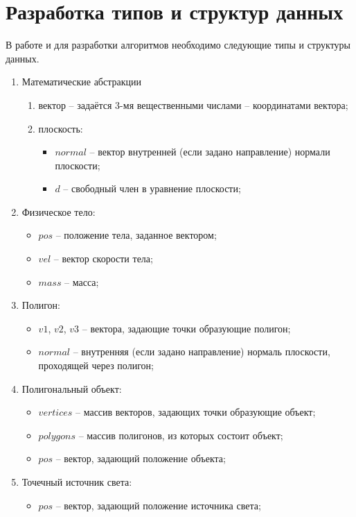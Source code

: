 \section{Разработка типов и структур данных}

В работе и для разработки алгоритмов необходимо следующие типы и структуры данных.

\begin{enumerate}
	\item Математические абстракции
	\begin{enumerate}
		\item вектор -- задаётся 3-мя вещественными числами -- координатами вектора;
		\item плоскость:
		\begin{itemize}
			\item $normal$ -- вектор внутренней (если задано направление) нормали плоскости;
			\item $d$ -- свободный член в уравнение плоскости;
		\end{itemize}
	\end{enumerate}
	\item Физическое тело:
	\begin{itemize}
		\item $pos$ -- положение тела, заданное вектором;
		\item $vel$ -- вектор скорости тела;
		\item $mass$ -- масса;
	\end{itemize}
	\item Полигон:
	\begin{itemize}
		\item $v1$, $v2$, $v3$ -- вектора, задающие точки образующие полигон;
		\item $normal$ -- внутренняя (если задано направление) нормаль плоскости, проходящей через полигон;
	\end{itemize}
	\item Полигональный объект:
	\begin{itemize}
		\item $vertices$ -- массив векторов, задающих точки образующие объект;
		\item $polygons$ -- массив полигонов, из которых состоит объект;
		\item $pos$ -- вектор, задающий положение объекта;
	\end{itemize}
	\item Точечный источник света:
	\begin{itemize}
		\item $pos$ -- вектор, задающий положение источника света;

\end{itemize}
\end{enumerate}
